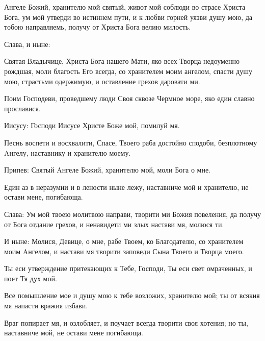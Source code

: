  


Ангеле Божий, хранителю мой святый, живот мой соблюди во страсе Христа Бога, ум мой утверди во истиннем пути, и к любви горней уязви душу мою, да тобою направляемь, получу от Христа Бога велию милость.


Слава, и ныне:


Святая Владычице, Христа Бога нашего Мати, яко всех Творца недоуменно рождшая, моли благость Его всегда, со хранителем моим ангелом, спасти душу мою, страстьми одержимую, и оставление грехов даровати ми.




Поим Господеви, проведшему люди Своя сквозе Чермное море, яко един славно прославися.


  Иисусу: Господи Иисусе Христе Боже мой, помилуй мя.


  Песнь воспети и восхвалити, Спасе, Твоего раба достойно сподоби, безплотному Aнгелу, наставнику и хранителю моему.


  Припев: Святый Aнгеле Божий, хранителю мой, моли Бога о мне.


  Един аз в неразумии и в лености ныне лежу, наставниче мой и хранителю, не остави мене, погибающа.


  Слава: Ум мой твоею молитвою направи, творити ми Божия повеления, да получу от Бога отдание грехов, и ненавидети ми злых настави мя, молюся ти.


  И ныне: Молися, Девице, о мне, рабе Твоем, ко Благодателю, со хранителем моим Aнгелом, и настави мя творити заповеди Сына Твоего и Творца моего. 



  Ты еси утверждение притекающих к Тебе, Господи, Ты еси свет омраченных, и поет Тя дух мой.


  Все помышление мое и душу мою к тебе возложих, хранителю мой; ты от всякия мя напасти вражия избави.


  Враг попирает мя, и озлобляет, и поучает всегда творити своя хотения; но ты, наставниче мой, не остави мене погибающа.


